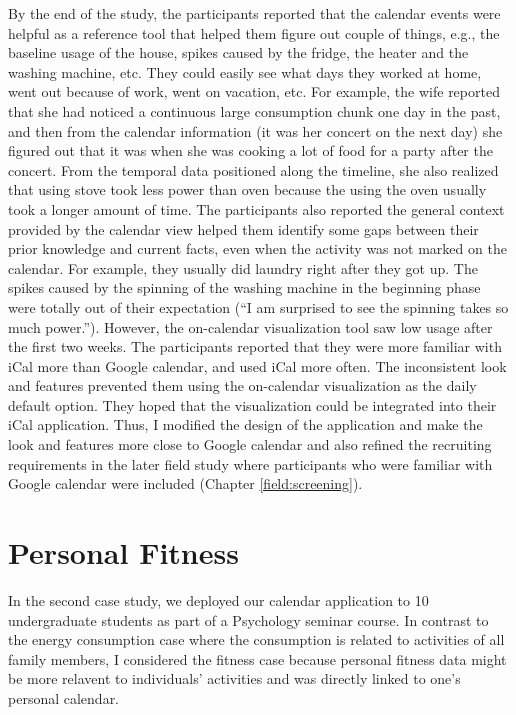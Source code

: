 \documentclass[12pt,oneside]{book}
\begin{document}
By the end of the study, the participants reported that the calendar events were helpful as a reference tool that helped them figure out couple of things, e.g., the baseline usage of the house, spikes caused by the fridge, the heater and the washing machine, etc. They could easily see what days they worked at home, went out because of work, went on vacation, etc. For example, the wife reported that she had noticed a continuous large consumption chunk one day in the past, and then from the calendar information (it was her concert on the next day) she figured out that it was when she was cooking a lot of food for a party after the concert. From the temporal data positioned along the timeline, she also realized that using stove took less power than oven because the using the oven usually took a longer amount of time. The participants also reported the general context provided by the calendar view helped them identify some gaps between their prior knowledge and current facts, even when the activity was not marked on the calendar. For example, they usually did laundry right after they got up. The spikes caused by the spinning of the washing machine in the beginning phase were totally out of their expectation (``I am surprised to see the spinning takes so much power.''). However, the on-calendar visualization tool saw low usage after the first two weeks. The participants reported that they were more familiar with iCal more than Google calendar, and used iCal more often. The inconsistent look and features prevented them using the on-calendar visualization as the daily default option. They hoped that the visualization could be integrated into their iCal application. Thus, I modified the design of the application and make the look and features more close to Google calendar and also refined the recruiting requirements in the later field study where participants who were familiar with Google calendar were included (Chapter \ref{field:screening}).

\section{Personal Fitness}
In the second case study, we deployed our calendar application to 10 undergraduate students as part of a Psychology seminar course.  In contrast to the energy consumption case where the consumption is related to activities of all family members, I considered the fitness case because personal fitness data might be more relavent to individuals' activities and was directly linked to one's personal calendar.
\end{document}
